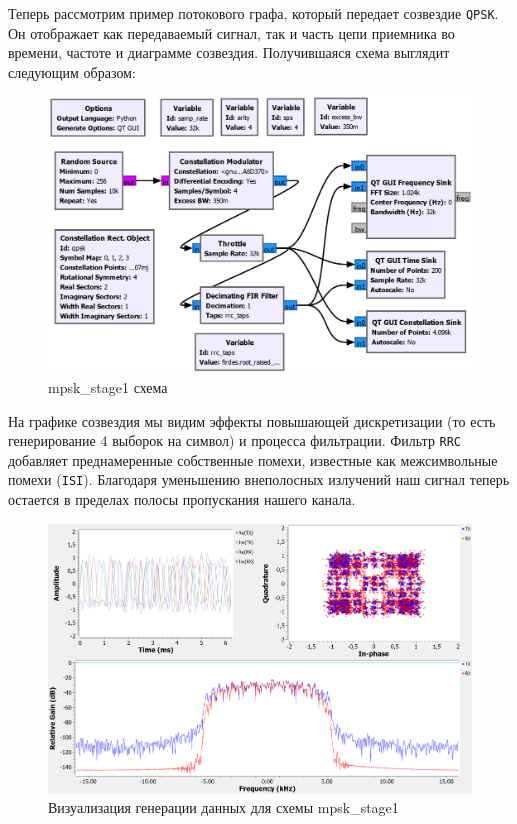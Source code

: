 \documentclass[a4paper,12pt]{report}
\begin{document}
Теперь рассмотрим пример потокового графа, который передает созвездие \texttt{QPSK}. Он отображает как передаваемый сигнал, так и часть цепи приемника во времени, частоте и диаграмме созвездия. Получившаяся схема выглядит следующим образом:

\begin{figure}[H]
        \centering
        \includegraphics[width=1.0\textwidth]{lab12_fig1_3.png}
        \caption{mpsk\_stage1 схема}
        \label{fig:lab12_fig1_3}
\end{figure}

На графике созвездия мы видим эффекты повышающей дискретизации (то есть генерирование 4 выборок на символ) и процесса фильтрации. Фильтр \texttt{RRC} добавляет преднамеренные собственные помехи, известные как межсимвольные помехи (\texttt{ISI}). Благодаря уменьшению внеполосных излучений наш сигнал теперь остается в пределах полосы пропускания нашего канала.

\begin{figure}[H]
        \centering
        \includegraphics[width=1.0\textwidth]{lab12_fig1_4.png}
        \caption{Визуализация генерации данных для схемы mpsk\_stage1}
        \label{fig:lab12_fig1_4}
\end{figure}
\end{document}
